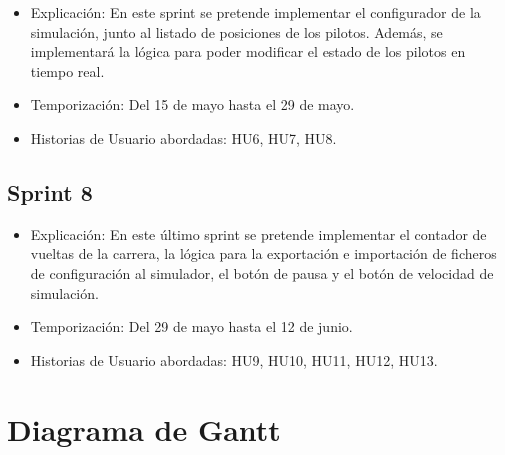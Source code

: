 \begin{itemize}
    \item Explicación: En este sprint se pretende implementar el configurador de la simulación, junto al listado de posiciones de los pilotos. Además, se implementará la lógica para poder modificar el estado de los pilotos en tiempo real.
    
    
    
    \item Temporización: Del 15 de mayo hasta el 29 de mayo.
    \item Historias de Usuario abordadas: HU6, HU7, HU8.
\end{itemize}

\subsection{Sprint 8}

\begin{itemize}
    \item Explicación: En este último sprint se pretende implementar el contador de vueltas de la carrera, la lógica para la exportación e importación de ficheros de configuración al simulador, el botón de pausa y el botón de velocidad de simulación.
    \item Temporización: Del 29 de mayo hasta el 12 de junio.
    \item Historias de Usuario abordadas: HU9, HU10, HU11, HU12, HU13.
\end{itemize}



\newpage
\section{Diagrama de Gantt}

